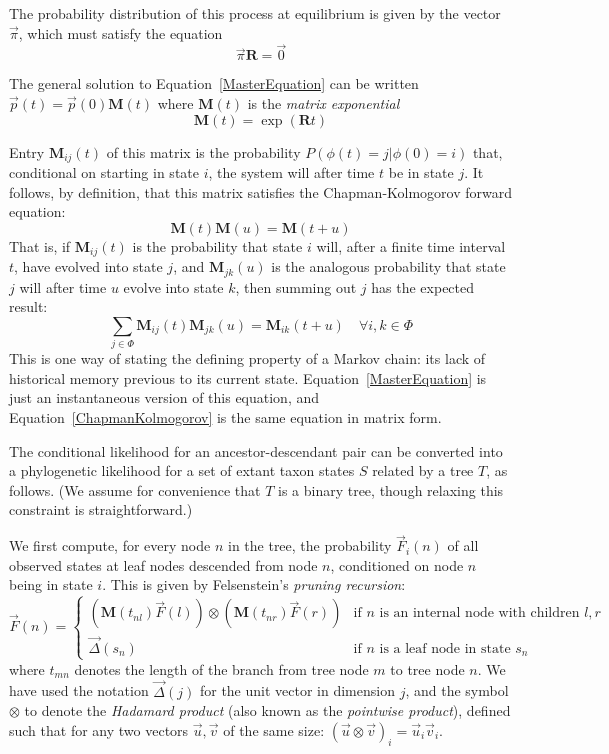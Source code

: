 \documentclass{bmcart}
\newcommand{\matr}[1]{\mathbf{#1}}
\newcommand{\eqref}[1]{Equation~\ref{#1}}
\newcommand{\statespace}{\Phi}
\newcommand{\state}{\phi}
\newcommand{\statevec}{\vec{p}}
\newcommand{\ratematrix}{\matr{R}}
\newcommand{\eqmvec}{\vec{\pi}}
\newcommand{\condmatrix}{\matr{M}}
\newcommand{\felsvec}{\vec{F}}
\newcommand{\unitvec}{\vec{\Delta}}
\newcommand{\pointprod}{\otimes}
\begin{document}
The probability distribution of this process at equilibrium is given by the vector $\eqmvec$,
which must satisfy the equation
\[
\eqmvec \ratematrix = \vec{0}
\]

The general solution to \eqref{MasterEquation} can be
written $\statevec(t) = \statevec(0) \condmatrix(t)$
where $\condmatrix(t)$ is the {\em matrix exponential}
\begin{equation}
\condmatrix(t) = \exp ( \ratematrix t )
\label{MatrixExponential}
\end{equation}

Entry $\condmatrix_{ij}(t)$ of this matrix is the probability
$P(\state(t)=j|\state(0)=i)$
that, conditional on starting in state $i$,
the system will after time $t$ be in state $j$.
It follows, by definition, that this matrix satisfies the
Chapman-Kolmogorov forward equation:
\begin{equation}
\condmatrix(t) \condmatrix(u) = \condmatrix(t+u)
\label{ChapmanKolmogorov}
\end{equation}
That is, if $\condmatrix_{ij}(t)$ is the probability
that state $i$ will, after a finite time interval $t$, have evolved into state $j$,
and $\condmatrix_{jk}(u)$ is the analogous probability that state $j$ will after time $u$ evolve into state $k$,
then summing out $j$ has the expected result:
\[
\sum_{j \in \statespace} \condmatrix_{ij}(t) \condmatrix_{jk}(u) = \condmatrix_{ik}(t+u)
\quad \forall i,k \in \statespace
\]
This is one way of stating the defining property of a Markov chain:
its lack of historical memory previous to its current state.
\eqref{MasterEquation} is just an instantaneous version of this equation,
and \eqref{ChapmanKolmogorov} is the same equation in matrix form.

The conditional likelihood for an ancestor-descendant pair can be converted
into a phylogenetic likelihood for a set of extant taxon states $S$ related by a tree $T$,
as follows.
(We assume for convenience that $T$ is a binary tree, though relaxing this constraint is straightforward.)

We first compute, for every node $n$ in the tree,
the probability $\felsvec_i(n)$
of all observed states at leaf nodes descended from node $n$,
conditioned on node $n$ being in state $i$.
This is given by Felsenstein's {\em pruning recursion}:
\begin{equation}
\felsvec(n) = \left\{
\begin{array}{ll}
\displaystyle
\left( \condmatrix(t_{nl}) \felsvec(l) \right)
\pointprod
\left( \condmatrix(t_{nr}) \felsvec(r) \right)
& \mbox{if $n$ is an internal node with children $l,r$} \\
\displaystyle
\vec{\Delta}(s_n)
& \mbox{if $n$ is a leaf node in state $s_n$}
\end{array}
\right.
\label{Felsenstein}
\end{equation}
where $t_{mn}$ denotes the length of the branch from tree node $m$ to tree node $n$.
We have used the notation
$\unitvec(j)$ for the unit vector in dimension $j$,
and the symbol
$\pointprod$ to denote the {\em Hadamard product} (also known as the {\em pointwise product}),
defined such that for any two vectors $\vec{u},\vec{v}$ of the same size:
$(\vec{u} \pointprod \vec{v})_i = \vec{u}_i \vec{v}_i$.
\end{document}
